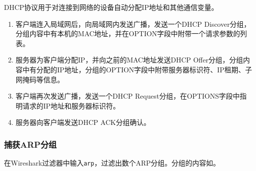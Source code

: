 \documentclass[lang=cn,11pt,a4paper,cite=authornum]{paper}
\begin{document}
DHCP协议用于对连接到网络的设备自动分配IP地址和其他通信变量。

\begin{enumerate}
    \item 客户端连入局域网后，向局域网内发送广播，发送一个DHCP Discover分组，分组内容中有本机的MAC地址，并在OPTION字段中附带一个请求参数的列表。
    \item 服务器为客户端分配IP，并向之前的MAC地址发送DHCP Offer分组，分组内容中有分配的IP地址，分组的OPTION字段中附带服务器标识符、IP租期、子网掩码等信息。
    \item 客户端再次发送广播，发送一个DHCP Request分组，在OPTIONS字段中指明请求的IP地址和服务器标识符。
    \item 服务器向客户端发送DHCP ACK分组确认。
\end{enumerate}

\subsubsection{捕获ARP分组}

在Wireshark过滤器中输入\texttt{arp}，过滤出数个ARP分组。分组的内容如。
\end{document}
